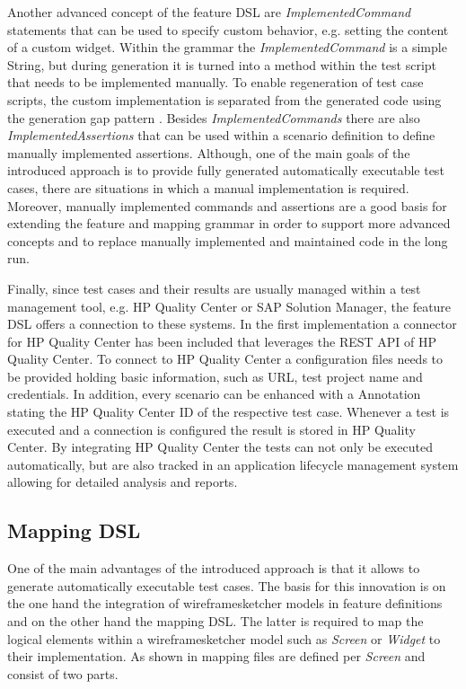 \documentclass{sig-alternate-05-2015}
\begin{document}
Another advanced concept of the feature DSL are \textit{ImplementedCommand} statements that can be used to specify custom behavior, e.g. setting the content of a custom widget.
Within the grammar the \textit{ImplementedCommand} is a simple String, but during generation it is turned into a method within the test script that needs to be implemented manually. 
To enable regeneration of test case scripts, the custom implementation is separated from the generated code using the generation gap pattern \cite{behrens.2009}.
Besides \textit{ImplementedCommands} there are also \textit{ImplementedAssertions} that can be used within a scenario definition to define manually implemented assertions.
Although, one of the main goals of the introduced approach is to provide fully generated automatically executable test cases, there are situations in which a manual implementation is required. 
Moreover, manually implemented commands and assertions are a good basis for extending the feature and mapping grammar in order to support more advanced concepts and to replace manually implemented and maintained code in the long run.

Finally, since test cases and their results are usually managed within a test management tool, e.g. HP Quality Center or SAP Solution Manager, the feature DSL offers a connection to these systems.
In the first implementation a connector for HP Quality Center has been included that leverages the REST API of HP Quality Center.
To connect to HP Quality Center a configuration files needs to be provided holding basic information, such as URL, test project name and credentials.
In addition, every scenario can be enhanced with a Annotation stating the HP Quality Center ID of the respective test case.
Whenever a test is executed and a connection is configured the result is stored in HP Quality Center.
By integrating HP Quality Center the tests can not only be executed automatically, but are also tracked in an application lifecycle management system allowing for detailed analysis and reports.


\subsection{Mapping DSL}
One of the main advantages of the introduced approach is that it allows to generate automatically executable test cases.
The basis for this innovation is on the one hand the integration of wireframesketcher models in feature definitions and on the other hand the mapping DSL.
The latter is required to map the logical elements within a wireframesketcher model such as \textit{Screen} or \textit{Widget} to their implementation.
As shown in  mapping files are defined per \textit{Screen} and consist of two parts.
\end{document}
